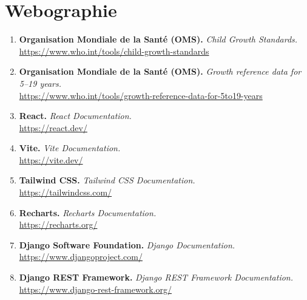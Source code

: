 \chapter*{Webographie}

\begin{enumerate}

    \item \textbf{Organisation Mondiale de la Santé (OMS).} \textit{Child Growth Standards.}\\
    \url{https://www.who.int/tools/child-growth-standards}\\

    \item \textbf{Organisation Mondiale de la Santé (OMS).} \textit{Growth reference data for 5--19 years.}\\
    \url{https://www.who.int/tools/growth-reference-data-for-5to19-years}\\

    \item \textbf{React.} \textit{React Documentation.}\\
    \url{https://react.dev/}\\

    \item \textbf{Vite.} \textit{Vite Documentation.}\\
    \url{https://vite.dev/}\\

    \item \textbf{Tailwind CSS.} \textit{Tailwind CSS Documentation.}\\
    \url{https://tailwindcss.com/}\\

    \item \textbf{Recharts.} \textit{Recharts Documentation.}\\
    \url{https://recharts.org/}\\

    \item \textbf{Django Software Foundation.} \textit{Django Documentation.}\\
    \url{https://www.djangoproject.com/}\\

    \item \textbf{Django REST Framework.} \textit{Django REST Framework Documentation.}\\
    \url{https://www.django-rest-framework.org/}\\


\end{enumerate}
